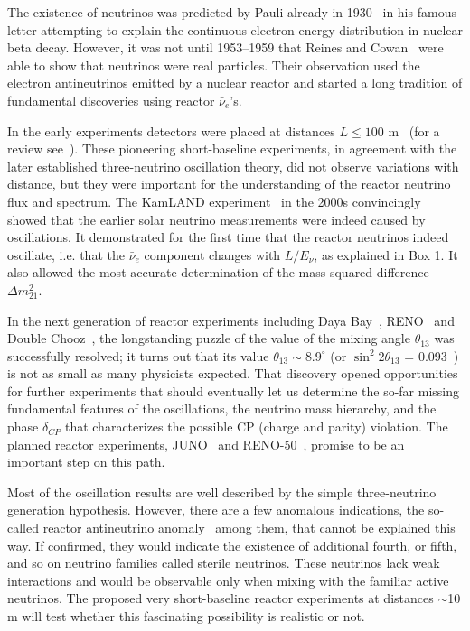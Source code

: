 \documentclass[aps,twocolumn,preprintnumbers,amsmath,superscriptaddress,amssymb,floats,nofootinbib]{revtex4-1}
\begin{document}
The existence of neutrinos was predicted by Pauli already in 1930~\cite{Pauli30} in his famous letter attempting to explain the continuous electron energy
distribution in nuclear beta decay.
However, it was not until 1953--1959 that Reines and Cowan~\cite{Reines53,Cowan56,Reines59} were able to show that neutrinos were real particles.
Their observation used the electron antineutrinos emitted by a nuclear reactor and started a long tradition of fundamental discoveries using reactor $\bar{\nu}_e$'s.

In the early experiments detectors were placed at distances $L \le 100$ m~\cite{ILL,Gosgen,Rovno,Krasnoyarsk,SRP,Bugey4,Bugey3} (for a review see~\cite{Bemporad02}).
These pioneering short-baseline experiments, in agreement with the later established three-neutrino oscillation theory, did not observe variations with distance,
but they were important for the understanding of the reactor neutrino flux and spectrum.
The KamLAND experiment~\cite{Kamland03,Kamland05,Kamland08} in the 2000s convincingly showed that the earlier solar neutrino measurements were indeed caused by oscillations.
It demonstrated for the first time that the reactor neutrinos indeed oscillate, i.e. that the $\bar{\nu}_e$ component changes with $L/E_{\nu}$, as explained in Box 1.
It also allowed the most accurate determination of the mass-squared difference $\Delta m^2_{21}$.


In the next generation of reactor experiments including Daya Bay~\cite{Dayabay,Dayabay14}, RENO~\cite{Reno}  and Double Chooz~\cite{DChooz,DChooz14}, the longstanding puzzle of the
value of the mixing angle $\theta_{13}$ was successfully resolved; it turns out that its value $\theta_{13} \sim 8.9^\circ$ (or $\sin^2 2\theta_{13}$ = 0.093~\cite{PDG14})
is not as small as many physicists expected. That discovery opened opportunities for further experiments that should eventually
let us determine the so-far missing fundamental features of the oscillations, the neutrino mass hierarchy, and the phase $\delta_{CP}$ that characterizes the possible CP (charge and parity) violation.
The planned reactor experiments, JUNO~\cite{He-Now2014} and RENO-50~\cite{RENO-50}, promise to be an important step on this path.

Most of the oscillation results are well described by the simple three-neutrino generation hypothesis. However, there are a few anomalous indications,
the so-called reactor antineutrino anomaly~\cite{Mention} among them, that cannot be explained this way. If confirmed, they would indicate the existence of additional
fourth, or fifth, and so on neutrino families called sterile neutrinos.
These neutrinos lack weak interactions and would be observable only when mixing with the familiar active neutrinos.
The proposed very short-baseline reactor experiments at distances $\sim$10 m will test whether this fascinating possibility is realistic or not.
\end{document}
